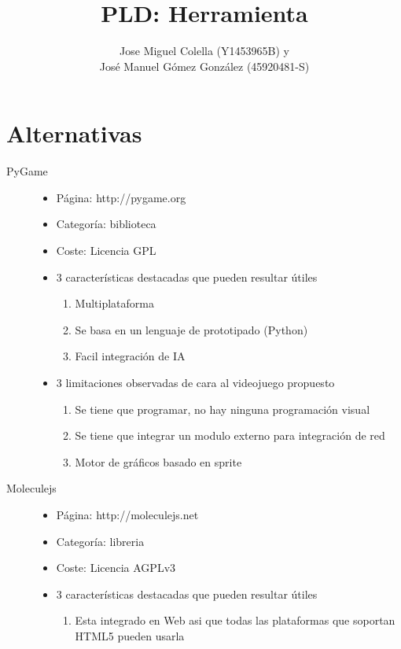 \documentclass[a4paper]{article}
\title{PLD: Herramienta}
\author{Jose Miguel Colella (Y1453965B) y\\José Manuel Gómez González (45920481-S)}
\begin{document}
\maketitle

\section{Alternativas}
\begin{description}
    \item[PyGame]
    \begin{itemize}
        \item Página: http://pygame.org
        \item Categoría: biblioteca
        \item Coste: Licencia GPL
        \item 3 características destacadas que pueden resultar útiles
            \begin{enumerate}
                \item Multiplataforma
                \item Se basa en un lenguaje de prototipado (Python)
                \item Facil integración de IA
            \end{enumerate}
        \item 3 limitaciones observadas de cara al videojuego propuesto
            \begin{enumerate}
                \item Se tiene que programar, no hay ninguna programación visual
                \item Se tiene que integrar un modulo externo para integración de red
                \item Motor de gráficos basado en sprite
            \end{enumerate}
    \end{itemize}
    \item[Moleculejs]
    \begin{itemize}
        \item Página: http://moleculejs.net
        \item Categoría: libreria
        \item Coste: Licencia AGPLv3
        \item 3 características destacadas que pueden resultar útiles
            \begin{enumerate}
                \item Esta integrado en Web asi que todas las plataformas que soportan HTML5 pueden usarla

\end{enumerate}
\end{itemize}
\end{description}
\end{document}
